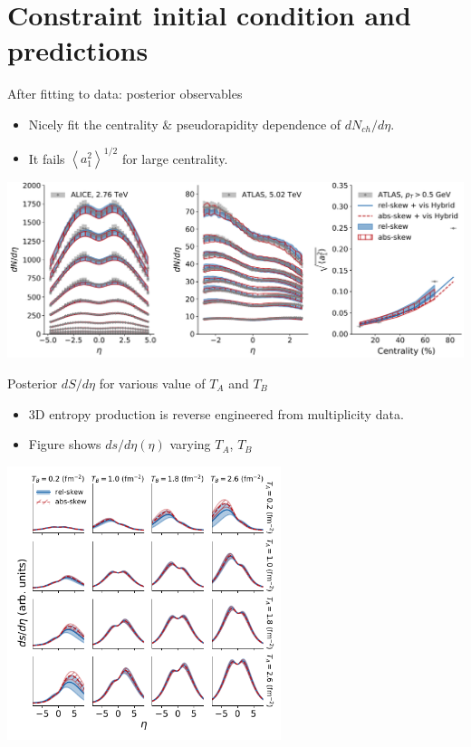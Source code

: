 \documentclass[11pt]{beamer}
\begin{document}
\section{Constraint initial condition and predictions}
\begin{frame}{After fitting to data: posterior observables}
\begin{itemize}
\item Nicely fit the centrality $\&$ pseudorapidity dependence of $dN_{ch}/d\eta$.
\item It fails $\left\langle a_1^2\right\rangle^{1/2}$ for large centrality.
\end{itemize}
\includegraphics[width=\textwidth]{post_obs.pdf}
\end{frame}

\begin{frame}{Posterior $dS/d\eta$ for various value of $T_A$ and $T_B$}
\begin{itemize}
\item 3D entropy production is reverse engineered from multiplicity data.
\item Figure shows $ds/d\eta(\eta)$ varying $T_A$, $T_B$
\end{itemize}
\begin{center}
\includegraphics[width=0.6\textwidth]{post_dsdy.pdf}
\end{center}
\end{frame}
\end{document}
